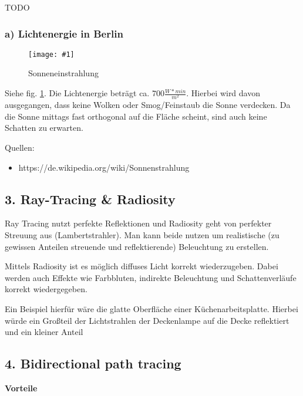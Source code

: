 \documentclass[a4paper,headings=small]{scrartcl}
\numberwithin{equation}{section} %
\numberwithin{figure}{section}   %
\newcommand{\image}[3]{
	\begin{figure}[htbp]
		\centering
		\texttt{[image: \#1]}
		\caption{#3}
		\label{fig:#1}
	\end{figure}
}
\begin{document}
TODO

\subsubsection*{a) Lichtenergie in Berlin}

\image{img/sonneneinstrahlung}{0.8}{Sonneneinstrahlung}

Siehe fig. \ref{fig:img/sonneneinstrahlung}.
Die Lichtenergie beträgt ca. $700 \frac{W * min}{m^2}$.
Hierbei wird davon ausgegangen,
dass keine Wolken oder Smog/Feinstaub die Sonne verdecken.
Da die Sonne mittags fast orthogonal auf die Fläche scheint,
sind auch keine Schatten zu erwarten.

Quellen:
\begin{itemize}
\item https://de.wikipedia.org/wiki/Sonnenstrahlung
\end{itemize}


\subsection*{3. Ray-Tracing \& Radiosity}

Ray Tracing nutzt perfekte Reflektionen und Radiosity geht von perfekter Streuung aus (Lambertstrahler).
Man kann beide nutzen um realistische (zu gewissen Anteilen streuende und reflektierende) Beleuchtung zu erstellen.

Mittels Radiosity ist es möglich diffuses Licht korrekt wiederzugeben.
Dabei werden auch Effekte wie Farbbluten, indirekte Beleuchtung und Schattenverläufe korrekt wiedergegeben. 

Ein Beispiel hierfür wäre die glatte Oberfläche einer Küchenarbeitsplatte.
Hierbei würde ein Großteil der Lichtstrahlen der Deckenlampe auf die Decke reflektiert und ein kleiner Anteil


\subsection*{4. Bidirectional path tracing}

\textbf{Vorteile}
\end{document}
